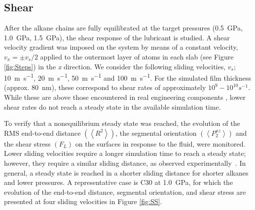 \documentclass[aps,prb,reprint,superscriptaddress, a4paper]{revtex4-1}
\begin{document}
\subsection{Shear}

After the alkane chains are fully equilibrated at the target pressures (\SI{0.5}{\giga\pascal}, \SI{1.0}{\giga\pascal}, \SI{1.5}{\giga\pascal}), the shear response of the lubricant is studied. A shear velocity gradient was imposed on the system by means of a constant velocity, $v_x = \pm v_s/2$ applied to the outermost layer of atoms in each slab (see Figure \ref{fig:Steps}) in the \emph{x} direction. We consider the following sliding velocities, $v_s$; \SI{10}{\meter\per\second}, \SI{20}{\meter\per\second}, \SI{50}{\meter\per\second} and \SI{100}{\meter\per\second}. For the simulated film thickness (approx. \SI{80}{\nano\meter}), these correspond to shear rates of approximately $10^{9} - 10^{10} s^{-1}$. While these are above those encountered in real engineering components \cite{Taylor2017}, lower shear rates do not reach a steady state in the available simulation time\cite{Ewen2018}.

To verify that a nonequilibrium steady state was reached, the evolution of the RMS end-to-end distance $\left(\left< R^2 \right> \right)$, the segmental orientation $\left(\left<P_{2}^{xz} \right> \right)$ and the shear stress $\left(F_L \right)$ on the surfaces in response to the fluid, were monitored. Lower sliding velocities require a longer simulation time to reach a steady state; however, they require a similar sliding distance, as observed experimentally~\cite{Drummond2000}. In general, a steady state is reached in a shorter sliding distance for shorter alkanes and lower pressures. A representative case is C30 at \SI{1.0}{\giga\pascal}, for which the evolution of the end-to-end distance, segmental orientation, and shear stress are presented at four sliding velocities in Figure \ref{fig:SS}.

\end{document}
